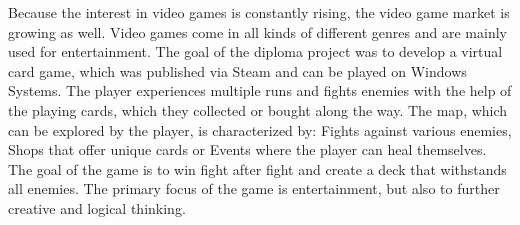 
Because the interest in video games is constantly rising, the video game market is growing as well.
Video games come in all kinds of different genres and are mainly used for entertainment.
The goal of the diploma project was to develop a virtual card game, which was published via Steam and can be played on
Windows Systems.
The player experiences multiple runs and fights enemies with the help of the playing cards, which they collected or bought
along the way.
The map, which can be explored by the player, is characterized by: Fights against various enemies, Shops that offer unique
cards or Events where the player can heal themselves.
The goal of the game is to win fight after fight and create a deck that withstands all enemies.
The primary focus of the game is entertainment, but also to further creative and logical thinking.
